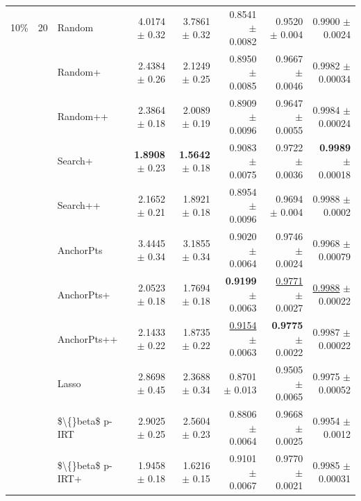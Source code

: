 \begin{longtable}{llp{}rrrrr}
\midrule
10\% & 20 & Random & 4.0174 {\scriptsize $\pm$ 0.32} & 3.7861 {\scriptsize $\pm$ 0.32} & 0.8541 {\scriptsize $\pm$ 0.0082} & 0.9520 {\scriptsize $\pm$ 0.004} & 0.9900 {\scriptsize $\pm$ 0.0024} \\
 &  & Random+ & 2.4384 {\scriptsize $\pm$ 0.26} & 2.1249 {\scriptsize $\pm$ 0.25} & 0.8950 {\scriptsize $\pm$ 0.0085} & 0.9667 {\scriptsize $\pm$ 0.0046} & 0.9982 {\scriptsize $\pm$ 0.00034} \\
 &  & Random++ & 2.3864 {\scriptsize $\pm$ 0.18} & 2.0089 {\scriptsize $\pm$ 0.19} & 0.8909 {\scriptsize $\pm$ 0.0096} & 0.9647 {\scriptsize $\pm$ 0.0055} & 0.9984 {\scriptsize $\pm$ 0.00024} \\
 &  & Search+ & \textbf{1.8908} {\scriptsize $\pm$ 0.23} & \textbf{1.5642} {\scriptsize $\pm$ 0.18} & 0.9083 {\scriptsize $\pm$ 0.0075} & 0.9722 {\scriptsize $\pm$ 0.0036} & \textbf{0.9989} {\scriptsize $\pm$ 0.00018} \\
 &  & Search++ & 2.1652 {\scriptsize $\pm$ 0.21} & 1.8921 {\scriptsize $\pm$ 0.18} & 0.8954 {\scriptsize $\pm$ 0.0096} & 0.9694 {\scriptsize $\pm$ 0.004} & 0.9988 {\scriptsize $\pm$ 0.0002} \\
 &  & AnchorPts & 3.4445 {\scriptsize $\pm$ 0.34} & 3.1855 {\scriptsize $\pm$ 0.34} & 0.9020 {\scriptsize $\pm$ 0.0064} & 0.9746 {\scriptsize $\pm$ 0.0024} & 0.9968 {\scriptsize $\pm$ 0.00079} \\
 &  & AnchorPts+ & 2.0523 {\scriptsize $\pm$ 0.18} & 1.7694 {\scriptsize $\pm$ 0.18} & \textbf{0.9199} {\scriptsize $\pm$ 0.0063} & \underline{0.9771} {\scriptsize $\pm$ 0.0027} & \underline{0.9988} {\scriptsize $\pm$ 0.00022} \\
 &  & AnchorPts++ & 2.1433 {\scriptsize $\pm$ 0.22} & 1.8735 {\scriptsize $\pm$ 0.22} & \underline{0.9154} {\scriptsize $\pm$ 0.0063} & \textbf{0.9775} {\scriptsize $\pm$ 0.0022} & 0.9987 {\scriptsize $\pm$ 0.00022} \\
 &  & Lasso & 2.8698 {\scriptsize $\pm$ 0.45} & 2.3688 {\scriptsize $\pm$ 0.34} & 0.8701 {\scriptsize $\pm$ 0.013} & 0.9505 {\scriptsize $\pm$ 0.0065} & 0.9975 {\scriptsize $\pm$ 0.00052} \\
 &  & \$\textbackslash\{\}beta\$ p-IRT & 2.9025 {\scriptsize $\pm$ 0.25} & 2.5604 {\scriptsize $\pm$ 0.23} & 0.8806 {\scriptsize $\pm$ 0.0064} & 0.9668 {\scriptsize $\pm$ 0.0025} & 0.9954 {\scriptsize $\pm$ 0.0012} \\
 &  & \$\textbackslash\{\}beta\$ p-IRT+ & 1.9458 {\scriptsize $\pm$ 0.18} & 1.6216 {\scriptsize $\pm$ 0.15} & 0.9101 {\scriptsize $\pm$ 0.0067} & 0.9770 {\scriptsize $\pm$ 0.0021} & 0.9985 {\scriptsize $\pm$ 0.00031} \\

\end{longtable}
